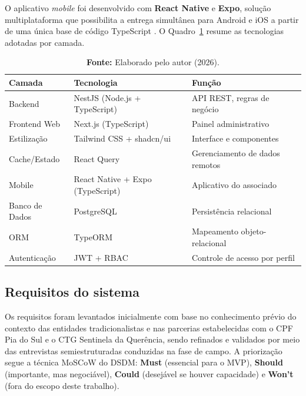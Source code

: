 \documentclass[12pt,a4paper]{article}
\begin{document}
O aplicativo \textit{mobile} foi desenvolvido com \textbf{React Native} e \textbf{Expo}, solução
multiplataforma que possibilita a entrega simultânea para Android e iOS a partir de uma única base de
código TypeScript \parencite{expo2023}. O Quadro~\ref{tab:stack} resume as tecnologias adotadas por
camada.

\begin{table}[H]
  \centering
  \caption{Stack tecnológica do ecossistema digital}
  \label{tab:stack}
  \begin{tabular}{lll}
    \toprule
    \textbf{Camada} & \textbf{Tecnologia} & \textbf{Função} \\
    \midrule
    Backend         & NestJS (Node.js + TypeScript)      & API REST, regras de negócio \\
    Frontend Web    & Next.js (TypeScript)                & Painel administrativo \\
    Estilização     & Tailwind CSS + shadcn/ui            & Interface e componentes \\
    Cache/Estado    & React Query                         & Gerenciamento de dados remotos \\
    Mobile          & React Native + Expo (TypeScript)    & Aplicativo do associado \\
    Banco de Dados  & PostgreSQL                          & Persistência relacional \\
    ORM             & TypeORM                             & Mapeamento objeto-relacional \\
    Autenticação    & JWT + RBAC                          & Controle de acesso por perfil \\
    \bottomrule
  \end{tabular}
  \caption*{\textbf{Fonte:} Elaborado pelo autor (2026).}
\end{table}

\subsection{Requisitos do sistema}
\label{sec:requisitos}

Os requisitos foram levantados inicialmente com base no conhecimento prévio do contexto das entidades
tradicionalistas e nas parcerias estabelecidas com o CPF Pia do Sul e o CTG Sentinela da Querência,
sendo refinados e validados por meio das entrevistas semiestruturadas conduzidas na fase de campo. A priorização segue a técnica
MoSCoW do DSDM: \textbf{Must} (essencial para o MVP), \textbf{Should} (importante, mas negociável),
\textbf{Could} (desejável se houver capacidade) e \textbf{Won't} (fora do escopo deste trabalho).
\end{document}
